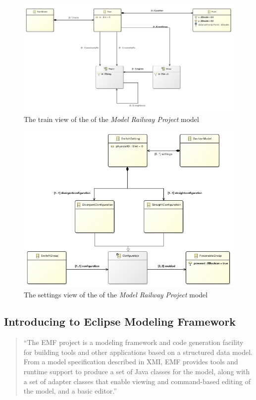 \begin{figure}[h]
	\centering
	\includegraphics[width=\linewidth]{include/figures/chapter_6/metamodels/trainmodel}
	\caption{The train view of the  of the \emph{Model Railway Project} model} 
	\label{fig:case_study:trainmodel}
\end{figure}
\begin{figure}[h]
	\centering
	\includegraphics[width=\linewidth]{include/figures/chapter_6/metamodels/settingmodel}
	\caption{The settings view of the  of the \emph{Model Railway Project} model} 
	\label{fig:case_study:settingmodel}
\end{figure}

\subsection{Introducing to Eclipse Modeling Framework}
\begin{quotation}
	``The EMF project is a modeling framework and code generation facility for building tools and other applications based on a structured data model. From a model specification described in XMI, EMF provides tools and runtime support to produce a set of Java classes for the model, along with a set of adapter classes that enable viewing and command-based editing of the model, and a basic editor.'' \cite{EMF}
\end{quotation}

